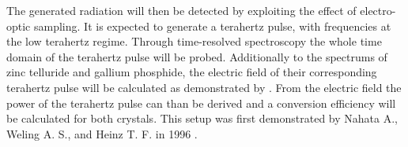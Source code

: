 The generated radiation will then be detected by exploiting the effect of electro-optic sampling.
It is expected to generate a terahertz pulse, with frequencies at the low terahertz regime.
Through time-resolved spectroscopy the whole time domain of the terahertz pulse will be probed.
Additionally to the spectrums of zinc telluride and gallium phosphide, the electric field of their corresponding terahertz pulse will be calculated as demonstrated by \cite{THZ_eltric_field}.
From the electric field the power of the terahertz pulse can than be derived and a conversion efficiency will be calculated for both crystals.
This setup was first demonstrated by Nahata A., Weling A. S., and Heinz T. F. in 1996 \cite{ZnTe_Nahata_Weling_1996}.






